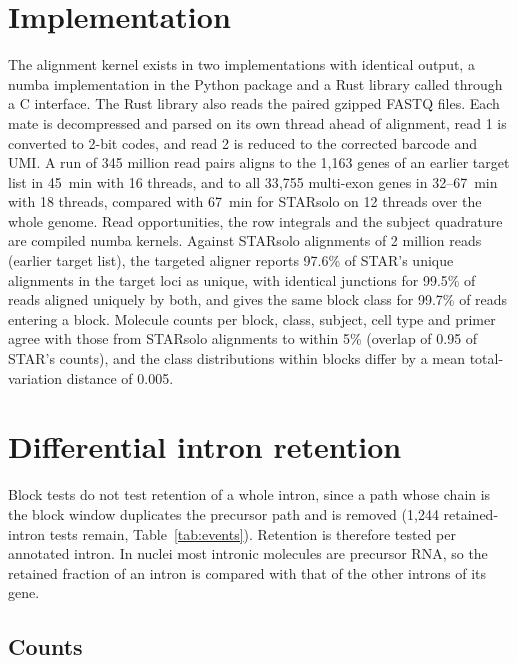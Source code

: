 \documentclass[11pt]{article}
\begin{document}
\section{Implementation}

The alignment kernel exists in two implementations with identical output, a numba implementation in the Python package and a Rust library called through a C interface. The Rust library also reads the paired gzipped FASTQ files. Each mate is decompressed and parsed on its own thread ahead of alignment, read 1 is converted to 2-bit codes, and read 2 is reduced to the corrected barcode and UMI. A run of 345 million read pairs aligns to the 1{,}163 genes of an earlier target list in 45~min with 16 threads, and to all 33{,}755 multi-exon genes in 32--67~min with 18 threads, compared with 67~min for STARsolo on 12 threads over the whole genome. Read opportunities, the row integrals and the subject quadrature are compiled numba kernels. Against STARsolo alignments of 2 million reads (earlier target list), the targeted aligner reports 97.6\% of STAR's unique alignments in the target loci as unique, with identical junctions for 99.5\% of reads aligned uniquely by both, and gives the same block class for 99.7\% of reads entering a block. Molecule counts per block, class, subject, cell type and primer agree with those from STARsolo alignments to within 5\% (overlap of 0.95 of STAR's counts), and the class distributions within blocks differ by a mean total-variation distance of 0.005.

\clearpage
\appendix

\section{Differential intron retention}
\label{sec:ir}

Block tests do not test retention of a whole intron, since a path whose chain is the block window duplicates the precursor path and is removed (1{,}244 retained-intron tests remain, Table~\ref{tab:events}). Retention is therefore tested per annotated intron. In nuclei most intronic molecules are precursor RNA, so the retained fraction of an intron is compared with that of the other introns of its gene.

\subsection{Counts}
\end{document}
